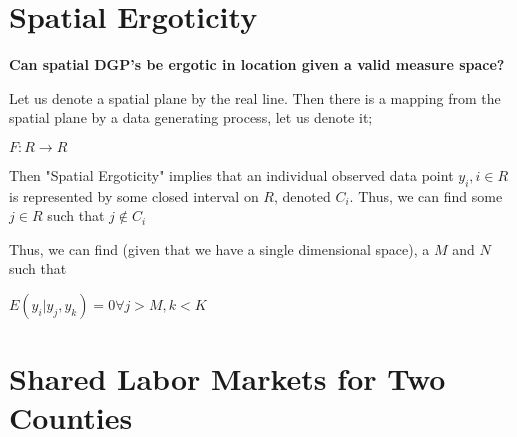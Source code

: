 \documentclass{article}
\begin{document}
\section{Spatial Ergoticity}

\textbf{Can spatial DGP's be ergotic in location given a valid measure space?}

Let us denote a spatial plane by the real line. Then there is a mapping from the spatial plane by a data generating process, let us denote it;

$F: R \to R$

Then "Spatial Ergoticity" implies that an individual observed data point $y_{i}, i \in R$ is represented by some closed interval on $R$, denoted $C_{i}$. Thus, we can find some $j \in R$ such that $j \not \in C_{i}$

Thus, we can find (given that we have a single dimensional space), a $M$ and $N$ such that

$E(y_{i}|y_{j},y_{k}) = 0 \forall j > M, k < K$

\section{Shared Labor Markets for Two Counties}
\end{document}
